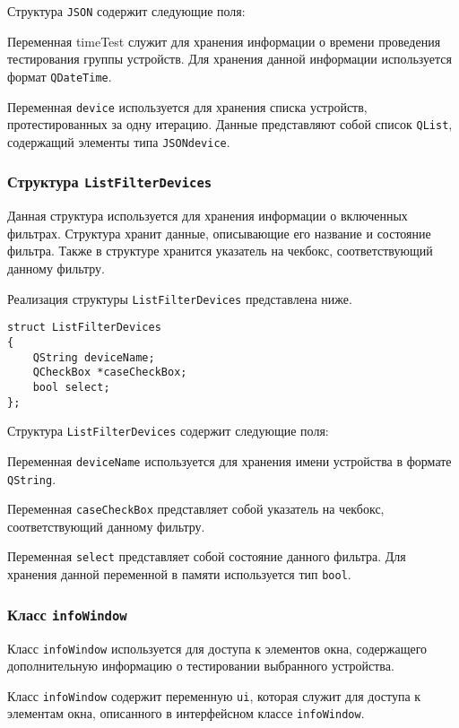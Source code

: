Структура \texttt{JSON} содержит следующие поля:
\begin{enum}
	\item Переменная timeTest служит для хранения информации о времени проведения тестирования группы устройств. Для
		хранения данной информации используется формат \texttt{QDateTime}.
	\item Переменная \texttt{device} используется для хранения списка устройств, протестированных за одну итерацию.
		Данные представляют собой список \texttt{QList}, содержащий элементы типа \texttt{JSONdevice}.
\end{enum}

\subsubsection{Структура \texttt{ListFilterDevices}}
Данная структура используется для хранения информации о включенных фильтрах. Структура хранит данные, описывающие его
название и состояние фильтра. Также в структуре хранится указатель на чекбокс, соответствующий данному фильтру.

Реализация структуры \texttt{ListFilterDevices} представлена ниже.
\medskip
\begin{verbatim}
struct ListFilterDevices
{
	QString deviceName;
	QCheckBox *caseCheckBox;
	bool select;
};
\end{verbatim}
\medskip

Структура \texttt{ListFilterDevices} содержит следующие поля:
\begin{enum}
	\item Переменная \texttt{deviceName} используется для хранения имени устройства в формате \texttt{QString}.
	\item Переменная \texttt{caseCheckBox} представляет собой указатель на чекбокс, соответствующий данному фильтру.
	\item Переменная \texttt{select} представляет собой состояние данного фильтра. Для хранения данной переменной в
		памяти используется тип \texttt{bool}.
\end{enum}

\subsubsection{Класс \texttt{infoWindow}}
Класс \texttt{infoWindow} используется для доступа к элементов окна, содержащего дополнительную информацию о
тестировании выбранного устройства.

Класс \texttt{infoWindow} содержит переменную \texttt{ui}, которая служит для доступа к элементам окна, описанного в
интерфейсном классе \texttt{infoWindow}.

